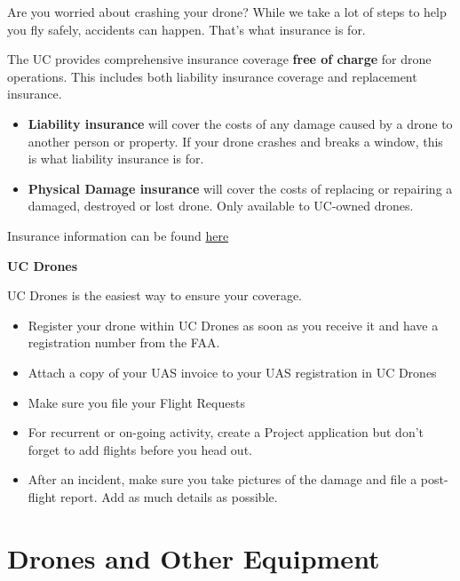 \documentclass[
  12pt,
]{book}
\providecommand{\tightlist}{%
  \setlength{\itemsep}{0pt}\setlength{\parskip}{0pt}}
\begin{document}
Are you worried about crashing your drone? While we take a lot of steps to help you fly safely, accidents can happen. That's what insurance is for.

The UC provides comprehensive insurance coverage \textbf{free of charge} for drone operations. This includes both liability insurance coverage and replacement insurance.

\begin{itemize}
\tightlist
\item
  \textbf{Liability insurance} will cover the costs of any damage caused by a drone to another person or property. If your drone crashes and breaks a window, this is what liability insurance is for.
\item
  \textbf{Physical Damage insurance} will cover the costs of replacing or repairing a damaged, destroyed or lost drone. Only available to UC-owned drones.
\end{itemize}

Insurance information can be found \href{https://ucdrones.github.io/ch-insurance.html}{here}

\textbf{UC Drones}

UC Drones is the easiest way to ensure your coverage.

\begin{itemize}
\tightlist
\item
  Register your drone within UC Drones as soon as you receive it and have a registration number from the FAA.
\item
  Attach a copy of your UAS invoice to your UAS registration in UC Drones
\item
  Make sure you file your Flight Requests
\item
  For recurrent or on-going activity, create a Project application but don't forget to add flights before you head out.
\item
  After an incident, make sure you take pictures of the damage and file a post-flight report. Add as much details as possible.
\end{itemize}

\chapter{Drones and Other Equipment}\label{drones-and-other-equipment}
\end{document}

